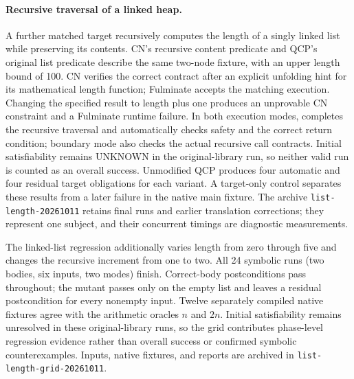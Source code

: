 \paragraph{Recursive traversal of a linked heap.}
A further matched target recursively computes the length of a singly linked
list while preserving its contents. CN's recursive content predicate and QCP's
original list predicate describe the same two-node fixture, with an upper
length bound of 100. CN verifies the correct contract after an explicit
unfolding hint for its mathematical length function; Fulminate accepts the
matching execution. Changing the specified result to length plus one produces
an unprovable CN constraint and a Fulminate runtime failure. In both execution
modes, \tespec{} completes the recursive traversal and automatically checks
safety and the correct return condition; boundary mode also checks the actual
recursive call contracts. Initial satisfiability remains UNKNOWN in the
original-library run, so neither valid run is counted as an overall success.
Unmodified QCP produces four automatic and four residual target obligations
for each variant. A target-only control separates these results from a later
failure in the native main fixture. The archive \texttt{list-length-20261011}
retains final runs and earlier translation corrections; they represent one
subject, and their concurrent timings are diagnostic measurements.

The linked-list regression additionally varies length from zero through five
and changes the recursive increment from one to two. All 24 symbolic runs
(two bodies, six inputs, two modes) finish. Correct-body postconditions pass
throughout; the mutant passes only on the empty list and leaves a residual
postcondition for every nonempty input. Twelve separately compiled native
fixtures agree with the arithmetic oracles $n$ and $2n$. Initial satisfiability
remains unresolved in these original-library runs, so the grid contributes
phase-level regression evidence rather than overall success or confirmed
symbolic counterexamples. Inputs, native fixtures, and reports are archived in
\texttt{list-length-grid-20261011}.

